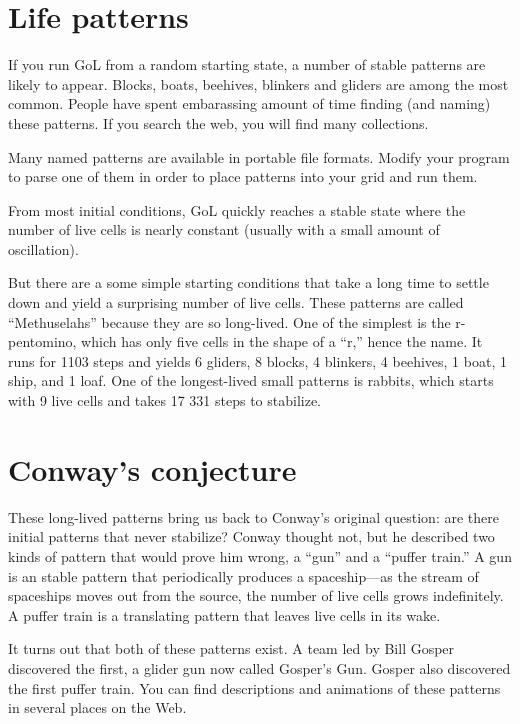 \documentclass[10pt]{book}
\begin{document}
\section{Life patterns}

If you run GoL from a random starting state, a number of stable
patterns are likely to appear.  Blocks, boats, beehives, blinkers and
gliders are among the most common.  People have spent embarassing
amount of time finding (and naming) these patterns.  If you search
the web, you will find many collections.

\begin{ex}

Many named patterns are available in portable file formats.
Modify your program to parse one of them in order to place patterns
into your grid and run them.

\end{ex}

From most initial conditions, GoL quickly reaches a stable
state where the number of live cells is nearly constant
(usually with a small amount of oscillation).

But there are a some simple starting conditions that take a
long time to settle down and yield a surprising
number of live cells.  These patterns are called ``Methuselahs''
because they are so long-lived.  One of the simplest is the
r-pentomino, which has only five cells in the shape of a ``r,'' hence
the name.  It runs for 1103 steps and yields 6 gliders, 8 blocks, 4
blinkers, 4 beehives, 1 boat, 1 ship, and 1 loaf.
One of the longest-lived small patterns is rabbits, which starts
with 9 live cells and takes 17 331 steps to stabilize.


\section{Conway's conjecture}

These long-lived patterns bring us back to Conway's original question:
are there initial patterns that never stabilize?  Conway thought not,
but he described two kinds of pattern that would prove him wrong, a
``gun'' and a ``puffer train.''  A gun is an stable pattern that
periodically produces a spaceship---as the stream of spaceships moves
out from the source, the number of live cells grows indefinitely.  A
puffer train is a translating pattern that leaves live cells in its
wake.

It turns out that both of these patterns exist.  A team led
by Bill Gosper discovered the first, a glider gun now called
Gosper's Gun.  Gosper also discovered the first puffer train.
You can find descriptions and animations of these patterns
in several places on the Web.
\end{document}
